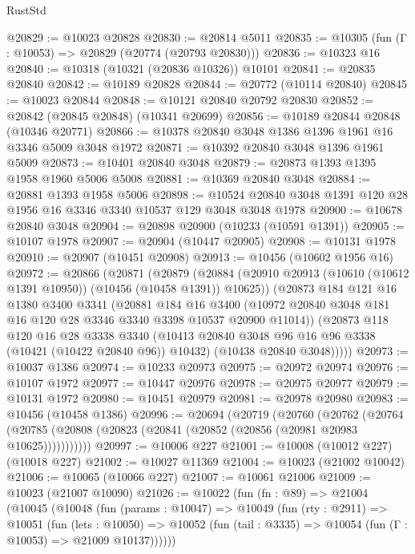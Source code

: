 \begin{lexlean}{RustStd}
\begin{coremodule}
@20829 := @10023 @20828
@20830 := @20814 @5011
@20835 := @10305 (fun (Γ : @10053) => @20829 (@20774 (@20793 @20830)))
@20836 := @10323 @16
@20840 := @10318 (@10321 (@20836 @10326)) @10101
@20841 := @20835 @20840
@20842 := @10189 @20828
@20844 := @20772 (@10114 @20840)
@20845 := @10023 @20844
@20848 := @10121 @20840 @20792 @20830
@20852 := @20842 (@20845 @20848) (@10341 @20699)
@20856 := @10189 @20844 @20848 (@10346 @20771)
@20866 := @10378 @20840 @3048 @1386 @1396 @1961 @16 @3346 @5009 @3048 @1972
@20871 := @10392 @20840 @3048 @1396 @1961 @5009
@20873 := @10401 @20840 @3048
@20879 := @20873 @1393 @1395 @1958 @1960 @5006 @5008
@20881 := @10369 @20840 @3048
@20884 := @20881 @1393 @1958 @5006
@20898 := @10524 @20840 @3048 @1391 @120 @28 @1956 @16 @3346 @3340 @10537 @129 @3048 @3048 @1978
@20900 := @10678 @20840 @3048
@20904 := @20898 @20900 (@10233 (@10591 @1391))
@20905 := @10107 @1978
@20907 := @20904 (@10447 @20905)
@20908 := @10131 @1978
@20910 := @20907 (@10451 @20908)
@20913 := @10456 (@10602 @1956 @16)
@20972 := @20866
    (@20871
      (@20879
        (@20884 (@20910 @20913 (@10610 (@10612 @1391 @10950)) (@10456 (@10458 @1391)) @10625))
        (@20873
          @184
          @121
          @16
          @1380
          @3400
          @3341
          (@20881
            @184
            @16
            @3400
            (@10972 @20840 @3048 @181 @16 @120 @28 @3346 @3340 @3398 @10537 @20900 @11014))
          (@20873
            @118
            @120
            @16
            @28
            @3338
            @3340
            (@10413 @20840 @3048 @96 @16 @96 @3338 (@10421 (@10422 @20840 @96)) @10432)
            (@10438 @20840 @3048)))))
@20973 := @10037 @1386
@20974 := @10233 @20973
@20975 := @20972 @20974
@20976 := @10107 @1972
@20977 := @10447 @20976
@20978 := @20975 @20977
@20979 := @10131 @1972
@20980 := @10451 @20979
@20981 := @20978 @20980
@20983 := @10456 (@10458 @1386)
@20996 := @20694
    (@20719
      (@20760
        (@20762
          (@20764 (@20785 (@20808 (@20823 (@20841 (@20852 (@20856 (@20981 @20983 @10625)))))))))))
@20997 := @10006 @227
@21001 := @10008 (@10012 @227) (@10018 @227)
@21002 := @10027 @11369
@21004 := @10023 (@21002 @10042)
@21006 := @10065 (@10066 @227)
@21007 := @10061 @21006
@21009 := @10023 (@21007 @10090)
@21026 := @10022
    (fun (fn : @89) =>
    @21004
      (@10045
        (@10048
          (fun (params : @10047) =>
          @10049
            (fun (rty : @2911) =>
            @10051
              (fun (lets : @10050) =>
              @10052 (fun (tail : @3335) => @10054 (fun (Γ : @10053) => @21009 @10137))))))

\end{coremodule}
\end{lexlean}
